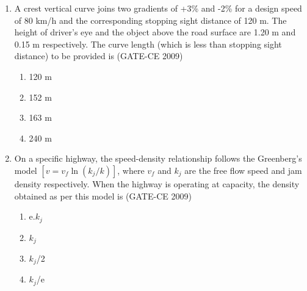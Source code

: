 \documentclass[journal,12pt,onecolumn]{article}
\theoremstyle{remark}
\begin{document}
\begin{enumerate}
    \item A crest vertical curve joins two gradients of +3\% and -2\% for a design speed of 80 km/h and the corresponding stopping sight distance of 120 m. The height of driver's eye and the object above the road surface are 1.20 m and 0.15 m respectively. The curve length (which is less than stopping sight distance) to be provided is (GATE-CE 2009)
    \begin{enumerate}
        \item 120 m 
        \item 152 m 
        \item 163 m 
        \item 240 m
    \end{enumerate}
    
    \item On a specific highway, the speed-density relationship follows the Greenberg's model $[v = v_f \ln(k_j / k)]$, where $v_f$ and $k_j$ are the free flow speed and jam density respectively. When the highway is operating at capacity, the density obtained as per this model is (GATE-CE 2009)
    \begin{enumerate}
        \item e.$k_j$ 
        \item $k_j$ 
        \item $k_j$/2 
        \item $k_j$/e
    \end{enumerate}
    

\end{enumerate}
\end{document}
